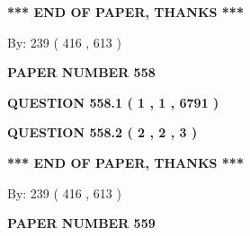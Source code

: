 \documentclass[12pt]{article}
\begin{document}
   
   
   
   
\vspace{1.0in} 
{\textbf{\large{ *** END OF PAPER, THANKS *** }}} 
   
   
\hspace{1.0in} By: 
 239 ( 416 ,  613 )
   
   
   
   
\newpage 
\setcounter{page}{ 
   558001 } 
   
   
   
   
 {\textbf{ \Large{ PAPER NUMBER  558  }}}
   
   
\vspace{0.2in}
   
   
   
   
   
   
 \vspace{0.2in}
 
 
 
 
   
   
  
\vspace{0.2in}
  
{\textbf{\Large{QUESTION
558.1 
 ( 1 , 1 , 6791 )
}}}
  
  
  
\vspace{0.2in}
  
{\textbf{\Large{QUESTION
558.2 
 ( 2 , 2 , 3 )
}}}
  
  
   
   
 \vspace{0.2in}
 
   
   
   
   
\vspace{1.0in} 
{\textbf{\large{ *** END OF PAPER, THANKS *** }}} 
   
   
\hspace{1.0in} By: 
 239 ( 416 ,  613 )
   
   
   
   
\newpage 
\setcounter{page}{ 
   559001 } 
   
   
   
   
 {\textbf{ \Large{ PAPER NUMBER  559  }}}
   
   
\vspace{0.2in}
   
\end{document}
